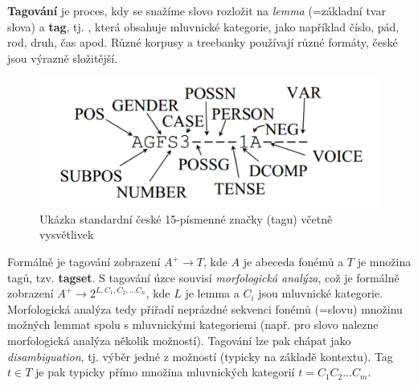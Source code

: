 \documentclass[11pt]{report} %
\numberwithin{equation}{section}
\begin{document}
\textbf{Tagování} je proces, kdy se snažíme slovo rozložit na \textit{lemma} (=základní tvar slova) a \textbf{tag}, tj. , která obsahuje mluvnické kategorie, jako například číslo, pád, rod, druh, čas apod. Různé korpusy a treebanky používají různé formáty, české jsou výrazně složitější.

\begin{figure}[H]
	\centering
	\includegraphics[scale = 1]{img/czechtag.png}
	\caption{Ukázka standardní české 15-písmenné značky (tagu) včetně vysvětlivek}
\end{figure}

Formálně je tagování zobrazení $A^+ \rightarrow T$, kde $A$ je abeceda fonémů a $T$ je množina tagů, tzv. \textbf{tagset}. S tagování úzce souvisí \textit{morfologická analýza}, což je formálně zobrazení $A^+ \rightarrow 2^{L, C_1, C_2, \dots C_n}$, kde $L$ je lemma a $C_i$ jsou mluvnické kategorie. Morfologická analýza tedy přiřadí neprázdné sekvenci fonémů (=slovu) množinu možných lemmat spolu s mluvnickými kategoriemi (např. pro slovo  nalezne morfologická analýza několik možností). Tagování lze pak chápat jako \textit{disambiguation}, tj. výběr jedné z možností (typicky na základě kontextu). Tag $t \in T$ je pak typicky přímo množina mluvnických kategorií $t = C_1C_2\dots C_m$.
\end{document}
